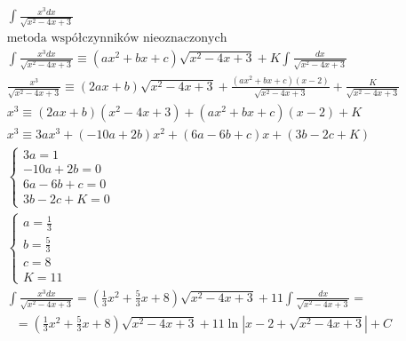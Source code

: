 \begin{gather*}
  \int \frac{x^3dx}{\sqrt{x^2-4x+3}} \\
  \text{metoda współczynników nieoznaczonych} \\
  \int \frac{x^3dx}{\sqrt{x^2-4x+3}} \equiv (ax^2+bx+c)\sqrt{x^2-4x+3}+K\int \frac{dx}{\sqrt{x^2-4x+3}} \\
\frac{x^3}{\sqrt{x^2-4x+3}} \equiv (2ax+b)\sqrt{x^2-4x+3}+\frac{(ax^2+bx+c)(x-2)}{\sqrt{x^2-4x+3}}+ \frac{K}{\sqrt{x^2-4x+3}} \\
x^3 \equiv (2ax+b)(x^2-4x+3)+(ax^2+bx+c)(x-2)+K \\
x^3 \equiv 3ax^3+(-10a+2b)x^2+(6a-6b+c)x+(3b-2c+K) \\
\begin{cases} 3a=1 \\ -10a+2b=0 \\ 6a-6b+c=0 \\ 3b-2c+K=0 \end{cases} \\
\begin{cases} a=\frac{1}{3} \\ b=\frac{5}{3} \\ c=8 \\ K=11 \end{cases} \\
\int \frac{x^3dx}{\sqrt{x^2-4x+3}} = (\frac{1}{3}x^2+\frac{5}{3}x+8)\sqrt{x^2-4x+3}+11\int \frac{dx}{\sqrt{x^2-4x+3}} = \end{gather*}
\begin{gather*}= (\frac{1}{3}x^2+\frac{5}{3}x+8)\sqrt{x^2-4x+3}+11\ln|x-2+\sqrt{x^2-4x+3}|+C\end{gather*}


